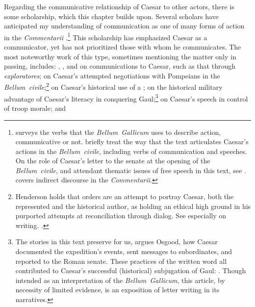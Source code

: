 \documentclass[12pt,letterpaper,oneside,final]{memoir}
\begin{document}
Regarding the communicative relationship of Caesar to other actors, there is some scholarship, which this chapter builds upon. Several scholars have anticipated my understanding of communication as one of many forms of action in the \emph{Commentarii} \parencite{oldsjo2001,batstonedamon2006}.\footnote{\textcite[401--454]{oldsjo2001} surveys the verbs that the \emph{Bellum~Gallicum} uses to describe action, communicative or not. \textcite[162--164]{batstonedamon2006} briefly treat the way that the text articulates Caesar's actions in the \emph{Bellum~civile}, including verbs of communication and speeches. On the role of Caesar's letter to the senate at the opening of the \emph{Bellum~civile}, and attendant thematic issues of free speech in this text, see \textcite[43--49]{batstonedamon2006}. \textcite{nordling1991} covers indirect discourse in the \emph{Commentarii}.} This scholarship has emphasized Caesar as a communicator, yet has not prioritized those with whom he communicates. The most noteworthy work of this type, sometimes mentioning the matter only in passing, includes: \textcite{bertrand1997}, \textcite{ezov1996}, and \textcite[125--131]{goldsworthy1996} on communications to Caesar, such as that through \emph{exploratores}; \textcite[262--272]{henderson1996} on Caesar's attempted negotiations with Pompeians in the \emph{Bellum~civile};\footnote{Henderson holds that orders are an attempt to portray Caesar, both the represented and the historical author, as holding an ethical high ground in his purported attempts at reconciliation through dialog. See especially \textcite[262--276]{henderson1996} on writing. .} \textcite[25--26]{hall1998} on Caesar's historical use of a ; \textcite[330--338]{osgood2009} on the historical military advantage of Caesar's literacy in conquering Gaul;\footnote{The stories in this text preserve for us, argues Osgood, how Caesar documented the expedition's events, sent messages to subordinates, and reported to the Roman senate. These practices of the written word all contributed to Caesar's successful (historical) subjugation of Gaul: . Though intended as an interpretation of the \emph{Bellum~Gallicum}, this article, by necessity of limited evidence, is an exposition of letter writing in its narratives.} \textcite{james2000} on Caesar's speech in control of troop morale; and 
\end{document}
